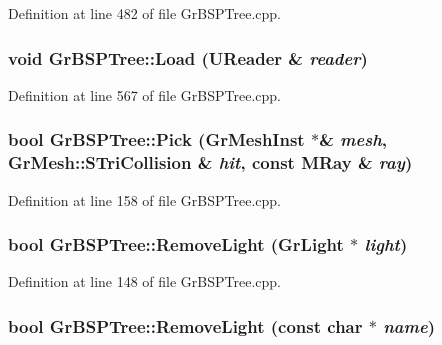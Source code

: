 Definition at line 482 of file GrBSPTree.cpp.\hypertarget{class_gr_b_s_p_tree_7ed8fc7d9debc4827138e75a4ef8f175}{
\subsubsection[{Load}]{\setlength{\rightskip}{0pt plus 5cm}void GrBSPTree::Load ({\bf UReader} \& {\em reader})}}
\label{class_gr_b_s_p_tree_7ed8fc7d9debc4827138e75a4ef8f175}




Definition at line 567 of file GrBSPTree.cpp.\hypertarget{class_gr_b_s_p_tree_183214f29232744efa570aa39db1810b}{
\subsubsection[{Pick}]{\setlength{\rightskip}{0pt plus 5cm}bool GrBSPTree::Pick ({\bf GrMeshInst} $\ast$\& {\em mesh}, \/  {\bf GrMesh::STriCollision} \& {\em hit}, \/  const {\bf MRay} \& {\em ray})}}
\label{class_gr_b_s_p_tree_183214f29232744efa570aa39db1810b}




Definition at line 158 of file GrBSPTree.cpp.\hypertarget{class_gr_b_s_p_tree_945f67a8ea6830ad1622880a48d3753a}{
\subsubsection[{RemoveLight}]{\setlength{\rightskip}{0pt plus 5cm}bool GrBSPTree::RemoveLight ({\bf GrLight} $\ast$ {\em light})}}
\label{class_gr_b_s_p_tree_945f67a8ea6830ad1622880a48d3753a}




Definition at line 148 of file GrBSPTree.cpp.\hypertarget{class_gr_b_s_p_tree_67eec7c3976ce36c454accf2e3c9ad20}{
\subsubsection[{RemoveLight}]{\setlength{\rightskip}{0pt plus 5cm}bool GrBSPTree::RemoveLight (const char $\ast$ {\em name})}}
\label{class_gr_b_s_p_tree_67eec7c3976ce36c454accf2e3c9ad20}




